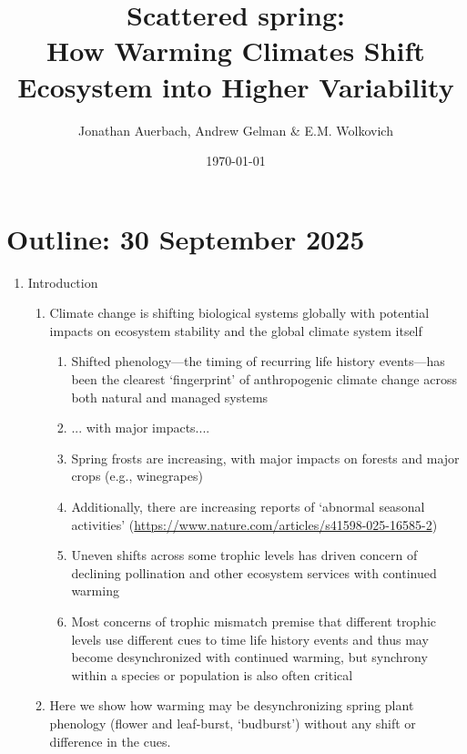 \documentclass[11pt]{article}
\begin{document}
\renewcommand{\refname}{\CHead{}}


\title{Scattered spring: \\How Warming Climates Shift Ecosystem into Higher Variability} 
\author{Jonathan Auerbach, Andrew Gelman \& E.M. Wolkovich} 
\date{\today}
\maketitle

\section{Outline: 30 September 2025 }


\begin{enumerate}
\item Introduction
\begin{enumerate}
\item Climate change is shifting biological systems globally with potential impacts on ecosystem stability and the global climate system itself \citep{richardson2023earth}
\begin{enumerate}
\item Shifted phenology---the timing of recurring life history events---has been the clearest `fingerprint' of anthropogenic climate change across both natural and managed systems
\item ... with major impacts.... 
\item Spring frosts are increasing, with major impacts on forests \citep{gu2008} and major crops (e.g., winegrapes)
\item Additionally, there are increasing reports of `abnormal seasonal activities' (\url{https://www.nature.com/articles/s41598-025-16585-2})
\item Uneven shifts across some trophic levels has driven concern of declining pollination and other ecosystem services with continued warming
\item Most concerns of trophic mismatch premise that different trophic levels use different cues to time life history events and thus may become desynchronized with continued warming, but synchrony within a species or population is also often critical
\end{enumerate}
\item Here we show how warming may be desynchronizing spring plant phenology (flower and leaf-burst, `budburst') without any shift or difference in the cues. 

\end{enumerate}
\end{enumerate}
\end{document}
